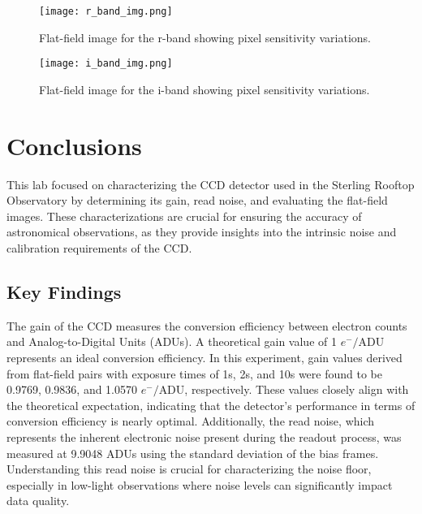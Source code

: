 \documentclass[linenumbers,twocolumn]{aastex631}
\begin{document}
\begin{figure}[h]
    \centering
    \texttt{[image: r\_band\_img.png]}
    \caption{Flat-field image for the r-band showing pixel sensitivity variations.}
    \label{fig:r_band}
\end{figure}

\begin{figure}[h]
    \centering
    \texttt{[image: i\_band\_img.png]}
    \caption{Flat-field image for the i-band showing pixel sensitivity variations.}
    \label{fig:i_band}
\end{figure}


\section{Conclusions}

This lab focused on characterizing the CCD detector used in the Sterling Rooftop Observatory by determining its gain, read noise, and evaluating the flat-field images. These characterizations are crucial for ensuring the accuracy of astronomical observations, as they provide insights into the intrinsic noise and calibration requirements of the CCD.

\subsection{Key Findings}

The gain of the CCD measures the conversion efficiency between electron counts and Analog-to-Digital Units (ADUs). A theoretical gain value of 1 $e^{-}/\text{ADU}$ represents an ideal conversion efficiency. In this experiment, gain values derived from flat-field pairs with exposure times of 1s, 2s, and 10s were found to be 0.9769, 0.9836, and 1.0570 $e^{-}/\text{ADU}$, respectively. These values closely align with the theoretical expectation, indicating that the detector's performance in terms of conversion efficiency is nearly optimal. Additionally, the read noise, which represents the inherent electronic noise present during the readout process, was measured at 9.9048 ADUs using the standard deviation of the bias frames. Understanding this read noise is crucial for characterizing the noise floor, especially in low-light observations where noise levels can significantly impact data quality. \\
\end{document}
